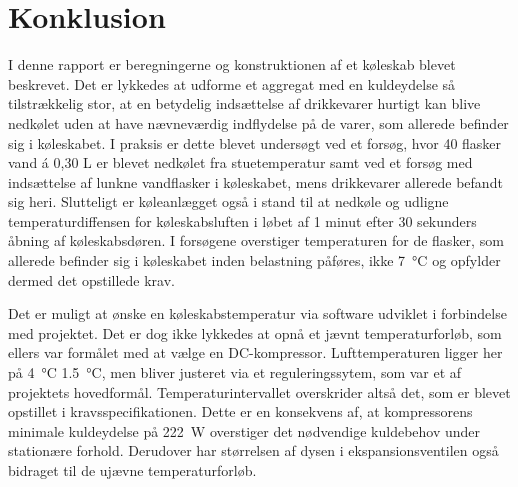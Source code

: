 \documentclass[../Hovedrapport.tex]{subfiles}
\begin{document}
\section{Konklusion}
I denne rapport er beregningerne og konstruktionen af et køleskab blevet beskrevet. Det er lykkedes at udforme et aggregat med en kuldeydelse så tilstrækkelig stor, at en betydelig indsættelse af drikkevarer hurtigt kan blive nedkølet uden at have nævneværdig indflydelse på de varer, som allerede befinder sig i køleskabet. I praksis er dette blevet undersøgt ved et forsøg, hvor 40 flasker vand á 0,30 L er blevet nedkølet fra stuetemperatur samt ved et forsøg med indsættelse af lunkne vandflasker i køleskabet, mens drikkevarer allerede befandt sig heri. Slutteligt er køleanlægget også i stand til at nedkøle og udligne temperaturdiffensen for køleskabsluften i løbet af 1 minut efter 30 sekunders åbning af køleskabsdøren. I forsøgene overstiger temperaturen for de flasker, som allerede befinder sig i køleskabet inden belastning påføres, ikke \SI{7}{\celsius} og opfylder dermed det opstillede krav.  

Det er muligt at ønske en køleskabstemperatur via software udviklet i forbindelse med projektet. Det er dog ikke lykkedes at opnå et jævnt temperaturforløb, som ellers var formålet med at vælge en DC-kompressor. Lufttemperaturen ligger her på \SI{4}{\celsius} \pm \SI{1,5}{\celsius}, men bliver justeret via et reguleringssytem, som var et af projektets hovedformål. Temperaturintervallet overskrider altså det, som er blevet opstillet i kravsspecifikationen. Dette er en konsekvens af, at kompressorens minimale kuldeydelse på \SI{222}{\watt} overstiger det nødvendige kuldebehov under stationære forhold. Derudover har størrelsen af dysen i ekspansionsventilen også bidraget til de ujævne temperaturforløb.
\end{document}
